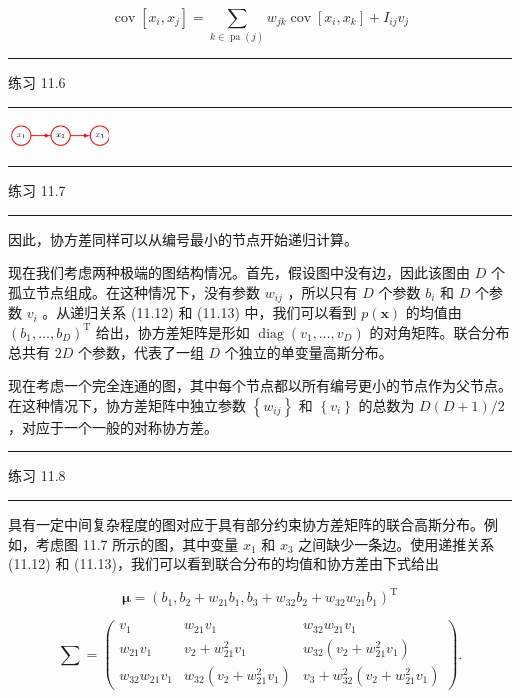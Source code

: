 \documentclass[10pt]{article}
\newcommand{\HRule}{\begin{center}\rule{0.9\linewidth}{0.2mm}\end{center}}
\begin{document}
\[
\operatorname{cov}\left\lbrack  {{x}_{i},{x}_{j}}\right\rbrack   = \mathop{\sum }\limits_{{k \in  \operatorname{pa}\left( j\right) }}{w}_{jk}\operatorname{cov}\left\lbrack  {{x}_{i},{x}_{k}}\right\rbrack   + {I}_{ij}{v}_{j} \tag{11.13}
\]

\HRule

练习 11.6

\HRule

\begin{center}
\includegraphics[max width=0.2\textwidth]{images/0194e279-9b28-703a-88f4-c3ac21e2010d_352_1208_346_334_85_0.jpg}
\end{center}
\hspace*{3em} 

\HRule

练习 11.7

\HRule

因此，协方差同样可以从编号最小的节点开始递归计算。

现在我们考虑两种极端的图结构情况。首先，假设图中没有边，因此该图由 \(D\) 个孤立节点组成。在这种情况下，没有参数 \({w}_{ij}\) ，所以只有 \(D\) 个参数 \({b}_{i}\) 和 \(D\) 个参数 \({v}_{i}\) 。从递归关系 (11.12) 和 (11.13) 中，我们可以看到 \(p\left( \mathbf{x}\right)\) 的均值由 \({\left( {b}_{1},\ldots ,{b}_{D}\right) }^{\mathrm{T}}\) 给出，协方差矩阵是形如 \(\operatorname{diag}\left( {{v}_{1},\ldots ,{v}_{D}}\right)\) 的对角矩阵。联合分布总共有 \({2D}\) 个参数，代表了一组 \(D\) 个独立的单变量高斯分布。

现在考虑一个完全连通的图，其中每个节点都以所有编号更小的节点作为父节点。在这种情况下，协方差矩阵中独立参数 \(\left\{  {w}_{ij}\right\}\) 和 \(\left\{  {v}_{i}\right\}\) 的总数为 \(D\left( {D + 1}\right) /2\) ，对应于一个一般的对称协方差。

\HRule

练习 11.8

\HRule

具有一定中间复杂程度的图对应于具有部分约束协方差矩阵的联合高斯分布。例如，考虑图 11.7 所示的图，其中变量 \({x}_{1}\) 和 \({x}_{3}\) 之间缺少一条边。使用递推关系 (11.12) 和 (11.13)，我们可以看到联合分布的均值和协方差由下式给出

\[
\mathbf{\mu } = {\left( {b}_{1},{b}_{2} + {w}_{21}{b}_{1},{b}_{3} + {w}_{32}{b}_{2} + {w}_{32}{w}_{21}{b}_{1}\right) }^{\mathrm{T}} \tag{11.14}
\]

\[
\mathbf{\sum } = \left( \begin{matrix} {v}_{1} & {w}_{21}{v}_{1} & {w}_{32}{w}_{21}{v}_{1} \\  {w}_{21}{v}_{1} & {v}_{2} + {w}_{21}^{2}{v}_{1} & {w}_{32}\left( {{v}_{2} + {w}_{21}^{2}{v}_{1}}\right) \\  {w}_{32}{w}_{21}{v}_{1} & {w}_{32}\left( {{v}_{2} + {w}_{21}^{2}{v}_{1}}\right) & {v}_{3} + {w}_{32}^{2}\left( {{v}_{2} + {w}_{21}^{2}{v}_{1}}\right)  \end{matrix}\right) . \tag{11.15}
\]
\end{document}
